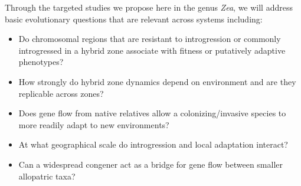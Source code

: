 Through the targeted studies we propose here in the genus \emph{Zea}, we will address basic evolutionary questions that are relevant across systems including:
\begin{itemize}\itemsep0pt
\item Do chromosomal regions that are resistant to introgression or commonly introgressed in a hybrid zone associate with fitness or putatively adaptive phenotypes?
\item How strongly do hybrid zone dynamics depend on environment and are they replicable across zones?
\item Does gene flow from native relatives allow a colonizing/invasive species to more readily adapt to new environments?
\item At what geographical scale do introgression and local adaptation interact?
\item Can a widespread congener act as a bridge for gene flow between smaller allopatric taxa?
\end{itemize}




